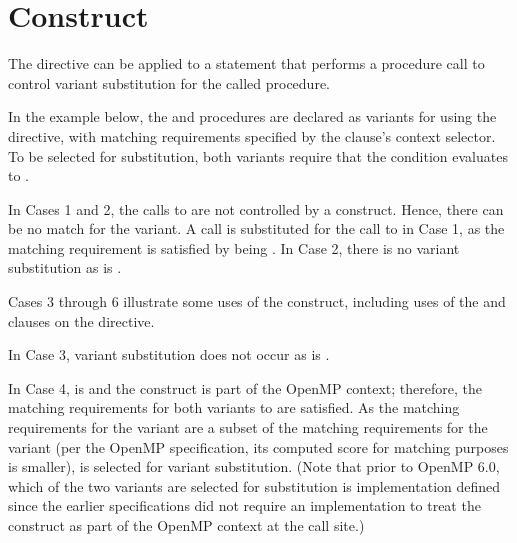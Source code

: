 \section{ Construct}
\label{sec:dispatch}




The  directive can be applied to a statement that performs a
procedure call to control variant substitution for the called procedure.

In the example below, the  and 
procedures are declared as variants for  using the
 directive, with matching requirements specified
by the  clause's context selector. To be selected for
substitution, both variants require that the condition  evaluates
to .

In Cases 1 and 2, the calls to  are not controlled by a
 construct. Hence, there can be no match for the
 variant. A  call is substituted for
the call to  in Case 1, as the matching requirement
is satisfied by  being . In Case 2, there is
no variant substitution as  is .

Cases 3 through 6 illustrate some uses of the  construct,
including uses of the  and  clauses on the
directive.

In Case 3, variant substitution does not occur as  is .

In Case 4,  is  and the  construct is
part of the OpenMP context; therefore, the matching requirements for both
variants to  are satisfied. As the matching requirements for the
 variant are a subset of the matching requirements for the
 variant (per the OpenMP specification, its computed score
for matching purposes is smaller),  is selected for
variant substitution. (Note that prior to OpenMP 6.0, which of the two variants
are selected for substitution is implementation defined since the earlier
specifications did not require an implementation to treat the 
construct as part of the OpenMP context at the call site.)

